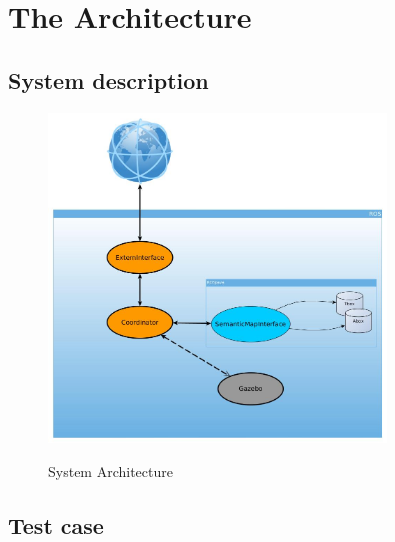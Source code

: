 \section{The Architecture}

\subsection{System description}

\begin{figure}[H]
\centering
\includegraphics[width=0.8\textwidth]{imgs/architecture.jpg}
\label{fig:actions}
\caption{System Architecture}
\end{figure}


\subsection{Test case}